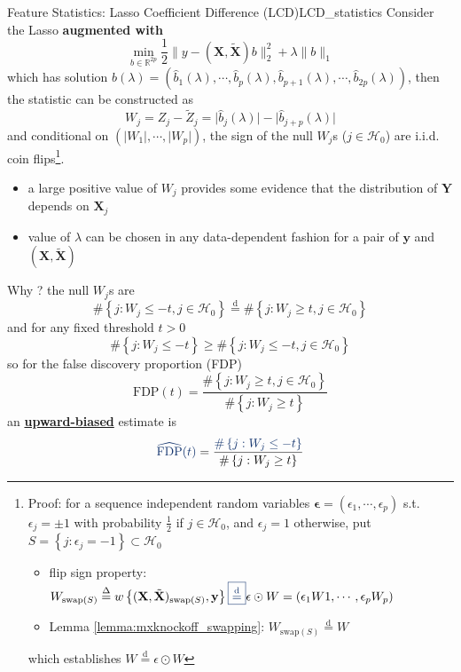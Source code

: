 \documentclass[twoside]{article}
\begin{document}
\begin{lemma}{Feature Statistics: Lasso Coefficient Difference (LCD)}{LCD_statistics}
    Consider the Lasso \textbf{{augmented with }} 
    $$
    \min_{b\in\mathbb{R}^{2p}}\frac{1}{2}\lVert y - (\mathbf{X},\tilde{\mathbf{X}})b \rVert^2_2 + \lambda \lVert b \rVert _1
    $$
    which has solution $ \hat{b}(\lambda) = (\hat{b}_1(\lambda),\cdots,\hat{b}_p(\lambda),\hat{b}_{p+1}(\lambda),\cdots,\hat{b}_{2p}(\lambda)) $, then the statistic can be constructed as 
    $$
    W_j = Z_j -\tilde{Z}_j = \lvert \hat{b}_j(\lambda) \rvert - \lvert \hat{b}_{j+p}(\lambda) \rvert
    $$
    and conditional on $\left( \lvert W_1 \rvert,\cdots, \lvert W_p \rvert \right)$, the sign of the null $W_j$s ($j\in \mathcal{H}_0$) are i.i.d. coin flips\footnote{Proof: for a sequence independent random variables $\boldsymbol{\epsilon}=(\epsilon_1,\cdots,\epsilon_p)$ s.t. $\epsilon_j = \pm 1$ with probability $\frac{1}{2}$ if $j\in\mathcal{H}_0$, and $\epsilon_j=1$ otherwise, put $S=\left\{j:\epsilon_j=-1\right\}\subset \mathcal{H}_0$
    \begin{itemize}
        \item flip sign property: $W_{\mathrm{swap}(S)} \overset{\Delta}{=}w \left\{ (\mathbf{X},\tilde{\mathbf{X}})_{\mathrm{swap}(S)},\mathbf{y} \right\} \textcolor{myblue}{\boxed{\overset{\mathrm{d}}{=}}} \epsilon \odot W = (\epsilon_1W1,\cdots,\epsilon_pW_p)$
        \item Lemma \ref{lemma:mxknockoff_swapping}: $W_{\mathrm{swap}(S)}\overset{\mathrm{d}}{=} W$
    \end{itemize}
    which establishes $W \overset{\mathrm{d}}{=} \epsilon \odot W $ }.
\end{lemma}
\begin{itemize}
    \item a large positive value of $W_j$ provides some evidence that the distribution of $\mathbf{Y}$ depends on $\mathbf{X}_j$
    \item value of $\lambda$ can be chosen in any data-dependent fashion for a pair of $\mathbf{y}$ and $(\mathbf{X},\tilde{\mathbf{X}})$ 
\end{itemize}

Why ? the null $W_j$s are 
$$
 \# \left\{ j: W_j\leq -t,j\in\mathcal{H}_0  \right\} \overset{\mathrm{d}}{=} \# \left\{ j: W_j\geq t,j\in\mathcal{H}_0  \right\}
$$
and for any fixed threshold $t>0$
$$
\# \left\{ j:W_j\leq -t \right\} \geq \# \left\{ j: W_j\leq -t,j\in\mathcal{H}_0  \right\}
$$
so for the false discovery proportion (FDP)
$$
{\mathrm{FDP}(t)} = \frac{ {\#\left\{j: W_j\geq t,j\in\mathcal{H}_0 \right\}} }{ \#\left\{ j:W_j\geq t \right\} }
$$
an \underline{\textbf{{upward-biased}}} estimate is
$$
{\textcolor{myblue}{\widehat{\mathrm{FDP}}(t)}} = \frac{ {\textcolor{myblue}{\# \left\{j: W_j\leq -t \right\}} } }{ \#\left\{ j:W_j\geq t \right\} }
$$



\newpage


\end{document}
